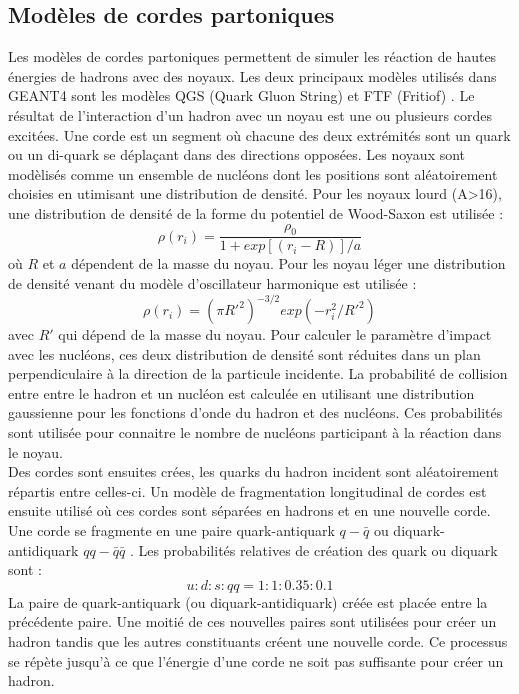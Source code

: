 \subsection{Modèles de cordes partoniques}
\label{sec.parton}
Les modèles de cordes partoniques permettent de simuler les réaction de hautes énergies de hadrons avec des noyaux. Les deux principaux modèles utilisés dans GEANT4 sont les modèles QGS (Quark Gluon String) et FTF (Fritiof) \cite{geant4_parton}. Le résultat de l'interaction d'un hadron avec un noyau est une ou plusieurs cordes excitées. Une corde est un segment où chacune des deux extrémités sont un quark ou un di-quark se déplaçant dans des directions opposées. Les noyaux sont modèlisés comme un ensemble de nucléons dont les positions sont aléatoirement choisies en utimisant une distribution de densité. Pour les noyaux lourd (A>16), une distribution de densité de la forme du potentiel de Wood-Saxon est utilisée : 
\begin{equation}
  \rho(r_i)=\frac{\rho_0}{1+exp[(r_i-R)]/a}
\end{equation}
où $R$ et $a$ dépendent de la masse du noyau. Pour les noyau léger une distribution de densité venant du modèle d'oscillateur harmonique est utilisée : 
\begin{equation}
  \rho(r_i)=(\pi R'^2)^{-3/2}exp(-r_i^2/R'^2)
\end{equation}
avec $R'$  qui dépend de la masse du noyau.
Pour calculer le paramètre d'impact avec les nucléons, ces deux distribution de densité sont réduites dans un plan perpendiculaire à la direction de la particule incidente. La probabilité de collision entre entre le hadron et un nucléon est calculée en utilisant une distribution gaussienne pour les fonctions d'onde du hadron et des nucléons. Ces probabilités sont utilisée pour connaitre le nombre de nucléons participant à la réaction dans le noyau.\\
Des cordes sont ensuites crées, les quarks du hadron incident sont aléatoirement répartis entre celles-ci. Un modèle de fragmentation longitudinal de cordes est ensuite utilisé où ces cordes sont séparées en hadrons et en une nouvelle corde. Une corde se fragmente en une paire quark-antiquark $q-\bar q$ ou diquark-antidiquark $qq-\bar q \bar q$ \cite{geant4_reference}. Les probabilités relatives de création des quark ou diquark sont :
\begin{equation}
  u:d:s:qq = 1:1:0.35:0.1
\end{equation}
La paire de quark-antiquark (ou diquark-antidiquark) créée est placée entre la précédente paire. Une moitié de ces nouvelles paires sont utilisées pour créer un hadron tandis que les autres constituants créent une nouvelle corde. Ce processus se répète jusqu'à ce que l'énergie d'une corde ne soit pas suffisante pour créer un hadron.\\
